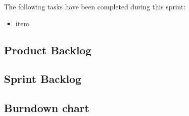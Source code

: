 \documentclass[a4paper,11pt]{article}
\begin{document}

The following tasks have been completed during this sprint:
\begin{itemize}
	\item item
\end{itemize}

%

\subsection{Product Backlog}


\subsection{Sprint Backlog}


\subsection{Burndown chart}
\end{document}
